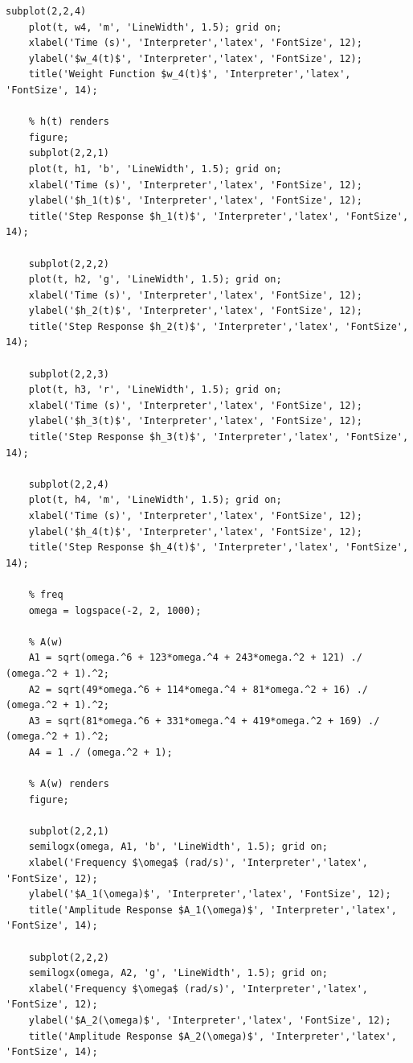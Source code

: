 \documentclass[a4paper, 12pt]{article}
\begin{document}
\begin{lstlisting}[label=task1, caption={Программа для задания 1}]
    subplot(2,2,4)
    plot(t, w4, 'm', 'LineWidth', 1.5); grid on;
    xlabel('Time (s)', 'Interpreter','latex', 'FontSize', 12);
    ylabel('$w_4(t)$', 'Interpreter','latex', 'FontSize', 12);
    title('Weight Function $w_4(t)$', 'Interpreter','latex', 'FontSize', 14);

    % h(t) renders
    figure;
    subplot(2,2,1)
    plot(t, h1, 'b', 'LineWidth', 1.5); grid on;
    xlabel('Time (s)', 'Interpreter','latex', 'FontSize', 12);
    ylabel('$h_1(t)$', 'Interpreter','latex', 'FontSize', 12);
    title('Step Response $h_1(t)$', 'Interpreter','latex', 'FontSize', 14);

    subplot(2,2,2)
    plot(t, h2, 'g', 'LineWidth', 1.5); grid on;
    xlabel('Time (s)', 'Interpreter','latex', 'FontSize', 12);
    ylabel('$h_2(t)$', 'Interpreter','latex', 'FontSize', 12);
    title('Step Response $h_2(t)$', 'Interpreter','latex', 'FontSize', 14);

    subplot(2,2,3)
    plot(t, h3, 'r', 'LineWidth', 1.5); grid on;
    xlabel('Time (s)', 'Interpreter','latex', 'FontSize', 12);
    ylabel('$h_3(t)$', 'Interpreter','latex', 'FontSize', 12);
    title('Step Response $h_3(t)$', 'Interpreter','latex', 'FontSize', 14);

    subplot(2,2,4)
    plot(t, h4, 'm', 'LineWidth', 1.5); grid on;
    xlabel('Time (s)', 'Interpreter','latex', 'FontSize', 12);
    ylabel('$h_4(t)$', 'Interpreter','latex', 'FontSize', 12);
    title('Step Response $h_4(t)$', 'Interpreter','latex', 'FontSize', 14);

    % freq
    omega = logspace(-2, 2, 1000);

    % A(w)
    A1 = sqrt(omega.^6 + 123*omega.^4 + 243*omega.^2 + 121) ./ (omega.^2 + 1).^2;
    A2 = sqrt(49*omega.^6 + 114*omega.^4 + 81*omega.^2 + 16) ./ (omega.^2 + 1).^2;
    A3 = sqrt(81*omega.^6 + 331*omega.^4 + 419*omega.^2 + 169) ./ (omega.^2 + 1).^2;
    A4 = 1 ./ (omega.^2 + 1);

    % A(w) renders
    figure;

    subplot(2,2,1)
    semilogx(omega, A1, 'b', 'LineWidth', 1.5); grid on;
    xlabel('Frequency $\omega$ (rad/s)', 'Interpreter','latex', 'FontSize', 12);
    ylabel('$A_1(\omega)$', 'Interpreter','latex', 'FontSize', 12);
    title('Amplitude Response $A_1(\omega)$', 'Interpreter','latex', 'FontSize', 14);

    subplot(2,2,2)
    semilogx(omega, A2, 'g', 'LineWidth', 1.5); grid on;
    xlabel('Frequency $\omega$ (rad/s)', 'Interpreter','latex', 'FontSize', 12);
    ylabel('$A_2(\omega)$', 'Interpreter','latex', 'FontSize', 12);
    title('Amplitude Response $A_2(\omega)$', 'Interpreter','latex', 'FontSize', 14);


\end{lstlisting}
\end{document}
